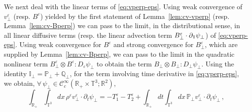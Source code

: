 \documentclass[11pt,reqno]{amsart}
\def \R{{\mathbb{R}}}
\def \Q{{\mathbb{Q}}}
\def \T{{\mathbb{T}}}
\def \P{{\mathbb{P}}}
\def \I{{\mathbb{I}}}
\newcommand{\myparallel}{{\mkern3mu\vphantom{\perp}\vrule depth 0pt\mkern2mu\vrule depth 0pt\mkern3mu}}
\begin{document}
We next deal with the linear terms of \eqref{eq:vperp-eps}. Using weak convergence of $v_\perp^\varepsilon$ (resp. $B^\varepsilon$) yielded by the first statement of Lemma~\ref{lem:cv-vperp} (resp. Lemma~\ref{lem:cv-Bperp}) we can pass to the limit, in the distributional sense, in all linear diffusive terms (resp. the linear advection term $B_\perp^\varepsilon \cdot \partial_\myparallel \psi_\perp$) of \eqref{eq:vperp-eps}. Using weak convergence for $B^\varepsilon$ and strong convergence for $B_\perp^\varepsilon$, which are supplied by Lemma~\ref{lem:cv-Bperp}, we can pass to the limit in the quadratic nonlinear term $B_\perp^\varepsilon \otimes B^\varepsilon :D_\varepsilon \psi_\perp$ to obtain the term $B_\perp \otimes B_\perp :D_\perp \psi_\perp$. Using the identity $\I_\perp=\P_\perp+\Q_\perp$, for the term involving time derivative in \eqref{eq:vperp-eps}, we obtain, $\forall \,\psi_\perp \in \mathscr{C}_c^\infty(\R_+\times \T^3;\R^2)$, 
\begin{equation}
  \label{eqn:ptrv}
\int_{\R_+}  \int_{\T^3}dx \, \rho^\varepsilon v_\perp^\varepsilon \cdot\partial_t \psi_\perp
=-T_1^\varepsilon -T_2^\varepsilon + \int_{\R_+}  dt \int_{\T^3}dx \,\P_\perp v_\perp^\varepsilon \cdot \partial_t \psi_\perp \,,
\end{equation}
\end{document}
